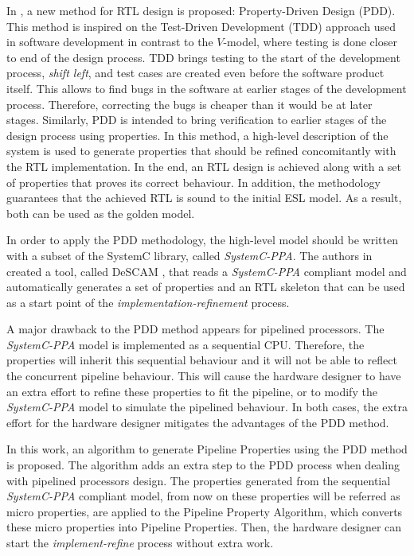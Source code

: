 In \cite{paper-pdd}, a new method for RTL design is proposed: Property-Driven Design (PDD). This method is inspired on the Test-Driven Development (TDD) approach used in software development in contrast to the $V$-model, where testing is done closer to end of the design process. TDD brings testing to the start of the development process, \textit{shift left}, and test cases are created even before the software product itself. This allows to find bugs in the software at earlier stages of the development process. Therefore, correcting the bugs is cheaper than it would be at later stages. Similarly, PDD is intended to bring verification to earlier stages of the design process using properties. In this method, a high-level description of the system is used to generate properties that should be refined concomitantly with the RTL implementation. In the end, an RTL design is achieved along with a set of properties that proves its correct behaviour. In addition, the methodology guarantees that the achieved RTL is sound to the initial ESL model. As a result, both can be used as the golden model.

In order to apply the PDD methodology, the high-level model should be written with a subset of the SystemC \cite{systemC} library, called \textit{SystemC-PPA}. The authors in \cite{paper-pdd} created a tool, called DeSCAM \cite{descam}, that reads a \textit{SystemC-PPA} compliant model and automatically generates a set of properties and an RTL skeleton that can be used as a start point of the \textit{implementation-refinement} process.

A major drawback to the PDD method appears for pipelined processors. The \textit{SystemC-PPA} model is implemented as a sequential CPU. Therefore, the properties will inherit this sequential behaviour and it will not be able to reflect the concurrent pipeline behaviour. This will cause the hardware designer to have an extra effort to refine these properties to fit the pipeline, or to modify the \textit{SystemC-PPA} model to simulate the pipelined behaviour. In both cases, the extra effort for the hardware designer mitigates the advantages of the PDD method.

In this work, an algorithm to generate Pipeline Properties using the PDD method is proposed. The algorithm adds an extra step to the PDD process when dealing with pipelined processors design. The properties generated from the sequential \textit{SystemC-PPA} compliant model, from now on these properties will be referred as micro properties, are applied to the Pipeline Property Algorithm, which converts these micro properties into Pipeline Properties. Then, the hardware designer can start the \textit{implement-refine} process without extra work.

